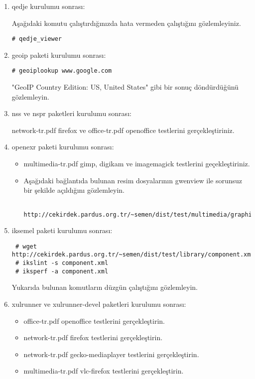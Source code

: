 \documentclass[a4paper,10pt]{article}
\begin{document}
\begin{enumerate}
\item qedje kurulumu sonrası:

Aşağıdaki komutu çalıştırdığınızda hata vermeden çalıştığını gözlemleyiniz.
\begin{verbatim}
# qedje_viewer
\end{verbatim}

\item geoip paketi kurulumu sonrası:
\begin{verbatim}
# geoiplookup www.google.com 
\end{verbatim}
"GeoIP Country Edition: US, United States" gibi bir sonuç döndürdüğünü gözlemleyin.

\item nss ve nspr paketleri kurulumu sonrası:

network-tr.pdf firefox ve office-tr.pdf openoffice testlerini gerçekleştiriniz.

\item openexr paketi kurulumu sonrası:
\begin{itemize}
 \item multimedia-tr.pdf gimp, digikam ve imagemagick testlerini geçekleştiriniz.
 \item Aşağıdaki bağlantıda bulunan resim dosyalarının gwenview ile sorunsuz bir şekilde açıldığını gözlemleyin.
  \begin{verbatim}
   http://cekirdek.pardus.org.tr/~semen/dist/test/multimedia/graphics/graphics.tar
  \end{verbatim}
\end{itemize}
\item iksemel paketi kurulumu sonrası:
\begin{verbatim}
 # wget http://cekirdek.pardus.org.tr/~semen/dist/test/library/component.xml
 # ikslint -s component.xml
 # iksperf -a component.xml 
\end{verbatim}


Yukarıda bulunan komutların düzgün çalıştığını gözlemleyin.

\item xulrunner ve xulrunner-devel paketleri kurulumu sonrası:
\begin{itemize}
\item office-tr.pdf openoffice testlerini gerçekleştirin.
\item network-tr.pdf firefox testlerini gerçekleştirin.
\item network-tr.pdf gecko-mediaplayer testlerini gerçekleştirin.
\item multimedia-tr.pdf vlc-firefox testlerini gerçekleştirin.
\end{itemize}


\end{enumerate}
\end{document}
